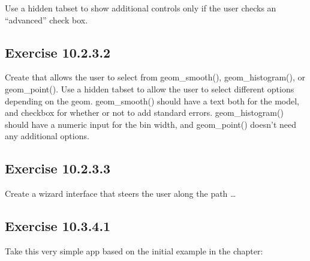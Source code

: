 \documentclass[]{book}
\begin{document}
Use a hidden tabset to show additional controls only if the user checks an ``advanced'' check box.

\hypertarget{exercise-10.2.3.2}{%
\subsection*{Exercise 10.2.3.2}\label{exercise-10.2.3.2}}

Create that allows the user to select from geom\_smooth(), geom\_histogram(), or geom\_point(). Use a hidden tabset to allow the user to select different options depending on the geom. geom\_smooth() should have a text both for the model, and checkbox for whether or not to add standard errors. geom\_histogram() should have a numeric input for the bin width, and geom\_point() doesn't need any additional options.

\hypertarget{exercise-10.2.3.3}{%
\subsection*{Exercise 10.2.3.3}\label{exercise-10.2.3.3}}

Create a wizard interface that steers the user along the path \ldots{}

\hypertarget{exercise-10.3.4.1}{%
\subsection*{Exercise 10.3.4.1}\label{exercise-10.3.4.1}}

Take this very simple app based on the initial example in the chapter:
\end{document}
